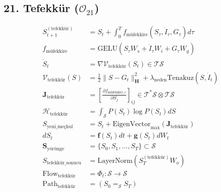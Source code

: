 \documentclass[11pt, a4paper]{article}
\begin{document}
\subsection{21. Tefekkür ($\mathcal{O}_{21}$)}
\begin{align}
S_{t+1}^{(\text{tefekkür})} &= S_t + \int_{0}^T f_{\text{müfekkire}}(S_\tau, \dot{I}_\tau, G_\tau) d\tau \\
f_{\text{müfekkire}} &= \text{GELU}(S_\tau W_s + \dot{I}_\tau W_i + G_\tau W_g) \\
\dot{S}_t &= \nabla \mathcal{V}_{\text{tefekkür}}(S_t) \in \mathcal{T}\mathcal{S} \\
\mathcal{V}_{\text{tefekkür}}(S) &= \frac{1}{2} \|S - G_t\|_{\mathbf{H}}^2 + \lambda_{\text{neden}} \text{Tenakuz}(S, \dot{I}_t) \\
\mathbf{J}_{\text{tefekkür}} &= \left[ \frac{\partial f_{\text{müfekkire}, i}}{\partial S_j} \right]_{ij} \in \mathcal{T}^*\mathcal{S} \otimes \mathcal{T}\mathcal{S} \\
\mathcal{H}_{\text{tefekkür}} &= \int_{\mathcal{S}} P(S_t) \log P(S_t) dS \\
S_{\text{yeni\_meçhul}} &= S_t + \text{EigenVector}_{\max}(\mathbf{J}_{\text{tefekkür}}) \\
d S_t &= \mathbf{f}(S_t) dt + \mathbf{g}(S_t) dW_t \\
\mathbf{S}_{\text{yörünge}} &= \{ S_0, S_1, \dots, S_T \} \subset \mathcal{S} \\
S_{\text{tefekkür\_sonucu}} &= \text{LayerNorm}(S_T^{(\text{tefekkür})} W_o) \\
\text{Flow}_{\text{tefekkür}} &= \Phi_t : \mathcal{S} \to \mathcal{S} \\
\text{Path}_{\text{tefekkür}} &= (S_0 =_{\mathcal{S}} S_T)
\end{align}
\end{document}
